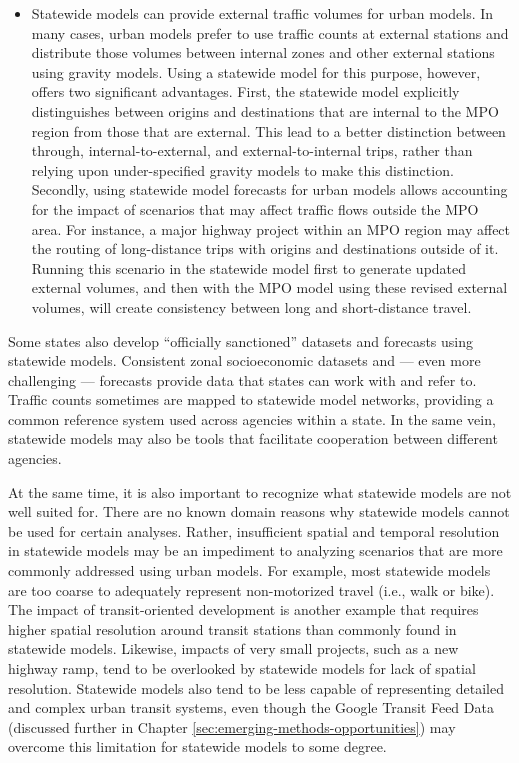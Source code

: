 \begin{itemize}
\item
Statewide models can provide external traffic volumes for urban models. In many cases, urban models prefer to use traffic counts at external stations and distribute those volumes between internal zones and other external stations using gravity models. Using a statewide model for this purpose, however, offers two significant advantages. First, the statewide model explicitly distinguishes between origins and destinations that are internal to the MPO region from those that are external. This lead to a better distinction between through, internal-to-external, and external-to-internal trips, rather than relying upon under-specified gravity models to make this distinction. Secondly, using statewide model forecasts for urban models allows accounting for the impact of scenarios that may affect traffic flows outside the MPO area. For instance, a major highway project within an MPO region may affect the routing of long-distance trips with origins and destinations outside of it. Running this scenario in the statewide model first to generate updated external volumes, and then with the MPO model using these revised external volumes, will create consistency between long and short-distance travel.
\end{itemize}

Some states also develop ``officially sanctioned'' datasets and forecasts using statewide models. Consistent zonal socioeconomic datasets and --- even more challenging --- forecasts provide data that states can work with and refer to. Traffic counts sometimes are mapped to statewide model networks, providing a common reference system used across agencies within a state. In the same vein, statewide models may also be tools that facilitate cooperation between different agencies.

At the same time, it is also important to recognize what statewide models are not well suited for. There are no known domain reasons why statewide models cannot be used for certain analyses. Rather, insufficient spatial and temporal resolution in statewide models may be an impediment to analyzing scenarios that are more commonly addressed using urban models. For example, most statewide models are too coarse to adequately represent non-motorized travel (i.e., walk or bike). The impact of transit-oriented development is another example that requires higher spatial resolution around transit stations than commonly found in statewide models. Likewise, impacts of very small projects, such as a new highway ramp, tend to be overlooked by statewide models for lack of spatial resolution. Statewide models also tend to be less capable of representing detailed and complex urban transit systems, even though the Google Transit Feed Data (discussed further in Chapter \ref{sec:emerging-methods-opportunities}) may overcome this limitation for statewide models to some degree.

